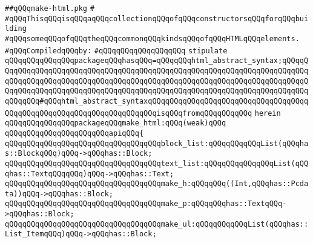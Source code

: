 \label{src/lib/html/make-html.pkg}
\verb|##qQQqmake-html.pkg|\newline
\verb|#|\newline
\verb|#qQQqThisqQQqisqQQqaqQQqcollectionqQQqofqQQqconstructorsqQQqforqQQqbuilding|\newline
\verb|#qQQqsomeqQQqofqQQqtheqQQqcommonqQQqkindsqQQqofqQQqHTMLqQQqelements.|\newline
\newline
\verb|#qQQqCompiledqQQqby:|\newline
\verb|#qQQqqQQqqQQqqQQqqQQq|\newline
\newline
\newline
\verb|stipulate|\newline
\verb|qQQqqQQqqQQqqQQqpackageqQQqhasqQQq=qQQqqQQqhtml_abstract_syntax;qQQqqQQqqQQqqQQqqQQqqQQqqQQqqQQqqQQqqQQqqQQqqQQqqQQqqQQqqQQqqQQqqQQqqQQqqQQqqQQqqQQqqQQqqQQqqQQqqQQqqQQqqQQqqQQqqQQqqQQqqQQqqQQqqQQqqQQqqQQqqQQqqQQqqQQqqQQqqQQqqQQqqQQqqQQqqQQqqQQqqQQqqQQqqQQqqQQqqQQqqQQqqQQqqQQqqQQqqQQqqQQq#qQQqhtml_abstract_syntaxqQQqqQQqqQQqqQQqqQQqqQQqqQQqqQQqqQQqqQQqqQQqqQQqqQQqqQQqqQQqqQQqqQQqqQQqisqQQqfromqQQqqQQqqQQq|\newline
\verb|herein|\newline
\newline
\verb|qQQqqQQqqQQqqQQqpackageqQQqmake_html:qQQq(weak)qQQq|\newline
\verb|qQQqqQQqqQQqqQQqqQQqqQQqapiqQQq{|\newline
\newline
\verb|qQQqqQQqqQQqqQQqqQQqqQQqqQQqqQQqqQQqblock_list:qQQqqQQqqQQqList(qQQqhas::BlockqQQq)qQQq->qQQqhas::Block;|\newline
\verb|qQQqqQQqqQQqqQQqqQQqqQQqqQQqqQQqqQQqtext_list:qQQqqQQqqQQqqQQqList(qQQqhas::TextqQQqqQQq)qQQq->qQQqhas::Text;|\newline
\newline
\verb|qQQqqQQqqQQqqQQqqQQqqQQqqQQqqQQqqQQqmake_h:qQQqqQQq((Int,qQQqhas::Pcdata))qQQq->qQQqhas::Block;|\newline
\newline
\verb|qQQqqQQqqQQqqQQqqQQqqQQqqQQqqQQqqQQqmake_p:qQQqqQQqhas::TextqQQq->qQQqhas::Block;|\newline
\verb|qQQqqQQqqQQqqQQqqQQqqQQqqQQqqQQqqQQqmake_ul:qQQqqQQqqQQqList(qQQqhas::List_ItemqQQq)qQQq->qQQqhas::Block;|\newline
